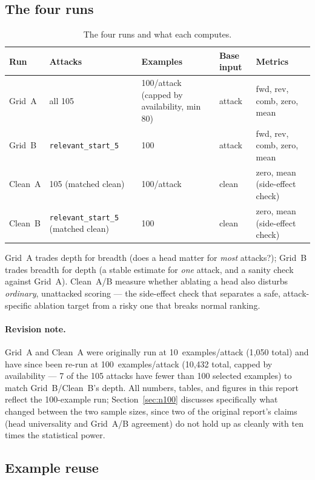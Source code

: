 \documentclass[11pt]{article}
\begin{document}
\subsection{The four runs}

\begin{table}[H]
\centering
\caption{The four runs and what each computes.}
\label{tab:runs}
\begin{tabular}{lllll}
\toprule
Run & Attacks & Examples & Base input & Metrics \\
\midrule
Grid~A & all 105       & 100/attack (capped by availability, min 80)  & attack  & fwd, rev, comb, zero, mean \\
Grid~B & \texttt{relevant\_start\_5} & 100 & attack & fwd, rev, comb, zero, mean \\
Clean~A & 105 (matched clean) & 100/attack & clean & zero, mean (side-effect check) \\
Clean~B & \texttt{relevant\_start\_5} (matched clean) & 100 & clean & zero, mean (side-effect check) \\
\bottomrule
\end{tabular}
\end{table}

Grid~A trades depth for breadth (does a head matter for \emph{most} attacks?);
Grid~B trades breadth for depth (a stable estimate for \emph{one} attack, and
a sanity check against Grid~A). Clean~A/B measure whether ablating a head
also disturbs \emph{ordinary}, unattacked scoring — the side-effect check
that separates a safe, attack-specific ablation target from a risky one that
breaks normal ranking.

\paragraph{Revision note.} Grid~A and Clean~A were originally run at
10~examples/attack (1{,}050 total) and have since been re-run at
100~examples/attack (10{,}432 total, capped by availability — 7 of the 105
attacks have fewer than 100 selected examples) to match Grid~B/Clean~B's
depth. All numbers, tables, and figures in this report reflect the
100-example run; Section~\ref{sec:n100} discusses specifically what changed
between the two sample sizes, since two of the original report's claims
(head universality and Grid~A/B agreement) do not hold up as cleanly with
ten times the statistical power.

\subsection{Example reuse}
\end{document}

